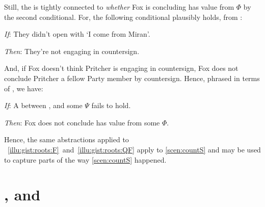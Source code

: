 \begin{note}
  Still, the \ros{} is tightly connected to \emph{whether} Fox is concluding \propI{\signConA{}} has value  from \(\Phi\) by the second conditional.
  For, the following conditional plausibly holds, from :
  \begin{itenum}
  \item[\emph{If}:]
    They didn't open with `I come from Miran'.
  \item[\emph{Then}:]
    They're not engaging in countersign.
  \end{itenum}
  And, if Fox doesn't think Pritcher is engaging in countersign, Fox does not conclude Pritcher a fellow Party member by countersign.
  Hence, phrased in terms of , we have:
  \begin{itenum}
  \item[\emph{If}:]
    A \ros{} between ,  and some \pool{} \(\Psi\) fails to hold.
  \item[\emph{Then}:]
    Fox does not conclude \propI{\signConA{}} has value  from some \pool{} \(\Phi\).
  \end{itenum}
  Hence, the same abstractions applied to ~\ref{illu:gist:roots:F}~and~\ref{illu:gist:roots:QF} apply to \autoref{scen:countS} and may be used to capture parts of the way \autoref{scen:countS} happened.
\end{note}



\section*{\qWhy{}, \qHow{} and \issueInclusion{}}
\label{cha:intro:why-how}


